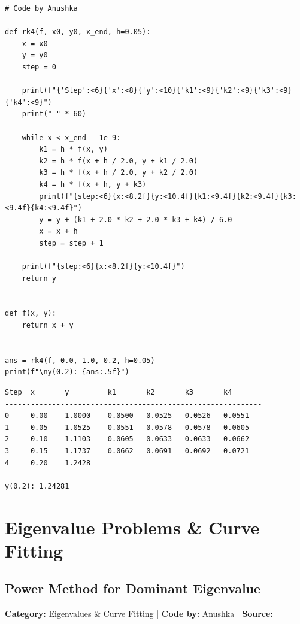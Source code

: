 \documentclass[10pt,a4paper]{report}
\begin{document}
\begin{tcolorbox}[colback=codebg,colframe=secondary,title=\textbf{Python Implementation (Step-by-Step Loops \& Pure Functions)},boxrule=1pt,arc=2mm]
\begin{lstlisting}[style=python_detailed]
# Code by Anushka

def rk4(f, x0, y0, x_end, h=0.05):
    x = x0
    y = y0
    step = 0

    print(f"{'Step':<6}{'x':<8}{'y':<10}{'k1':<9}{'k2':<9}{'k3':<9}{'k4':<9}")
    print("-" * 60)

    while x < x_end - 1e-9:
        k1 = h * f(x, y)
        k2 = h * f(x + h / 2.0, y + k1 / 2.0)
        k3 = h * f(x + h / 2.0, y + k2 / 2.0)
        k4 = h * f(x + h, y + k3)
        print(f"{step:<6}{x:<8.2f}{y:<10.4f}{k1:<9.4f}{k2:<9.4f}{k3:<9.4f}{k4:<9.4f}")
        y = y + (k1 + 2.0 * k2 + 2.0 * k3 + k4) / 6.0
        x = x + h
        step = step + 1

    print(f"{step:<6}{x:<8.2f}{y:<10.4f}")
    return y


def f(x, y):
    return x + y


ans = rk4(f, 0.0, 1.0, 0.2, h=0.05)
print(f"\ny(0.2): {ans:.5f}")

\end{lstlisting}
\end{tcolorbox}

\begin{tcolorbox}[colback=termbg,colframe=primary,title=\textbf{Program Execution Output \& Convergence Table},boxrule=1pt,arc=2mm]
\begin{lstlisting}[style=terminal_output]
Step  x       y         k1       k2       k3       k4       
------------------------------------------------------------
0     0.00    1.0000    0.0500   0.0525   0.0526   0.0551   
1     0.05    1.0525    0.0551   0.0578   0.0578   0.0605   
2     0.10    1.1103    0.0605   0.0633   0.0633   0.0662   
3     0.15    1.1737    0.0662   0.0691   0.0692   0.0721   
4     0.20    1.2428    

y(0.2): 1.24281
\end{lstlisting}
\end{tcolorbox}

\newpage

\chapter{Eigenvalue Problems \& Curve Fitting}

\section{Power Method for Dominant Eigenvalue}
\textbf{Category:} \textcolor{secondary}{Eigenvalues \& Curve Fitting} \quad | \quad \textbf{Code by:} \textcolor{secondary}{Anushka} \quad | \quad \textbf{Source:} \texttt{}
\end{document}
